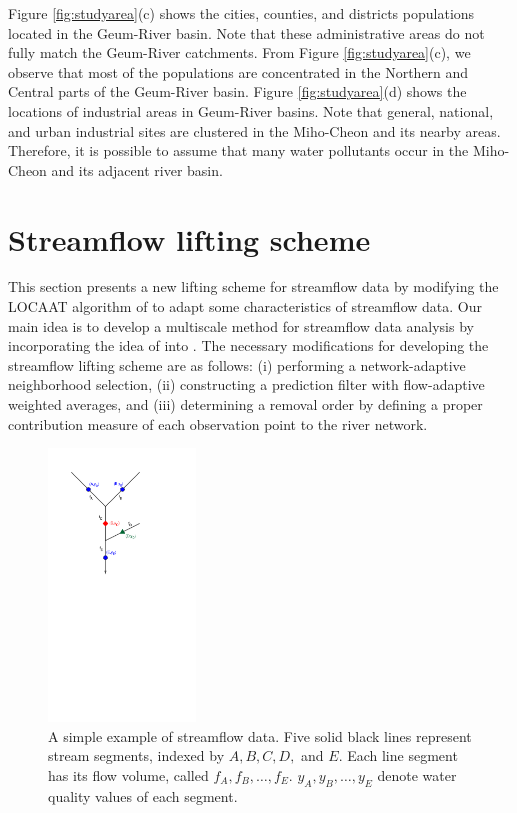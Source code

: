 \documentclass[11pt,titlepage]{article}
\begin{document}
Figure \ref{fig:studyarea}(c) shows the cities, counties, and districts populations located in the Geum-River basin. Note that these administrative areas do not fully match the Geum-River catchments. From Figure \ref{fig:studyarea}(c), we observe that most of the populations are concentrated in the Northern and Central parts of the Geum-River basin. Figure \ref{fig:studyarea}(d) shows the locations of industrial areas in Geum-River basins. Note that general, national, and urban industrial sites are clustered in the Miho-Cheon and its nearby areas. Therefore, it is possible to assume that many water pollutants occur in the Miho-Cheon and its adjacent river basin.


\section{Streamflow lifting scheme}\label{sec:streamflowliftingscheme}

This section presents a new lifting scheme for streamflow data by modifying the LOCAAT algorithm of  \citet{Jansen2009} to adapt some characteristics of streamflow data. Our main idea is to develop a multiscale method for streamflow data analysis by incorporating the idea of \cite{Nunes2006} into \cite{ODonnell2014}. The necessary modifications for developing the streamflow lifting scheme are as follows: (i) performing a network-adaptive neighborhood selection, (ii) constructing a prediction filter with flow-adaptive weighted averages, and (iii) determining a removal order by defining a proper contribution measure of each observation point to the river network.

\begin{figure}
	\centering\includegraphics[width=0.35\textwidth]{Stream_result/Node-flow-complexed2-3.pdf}
	\vspace{-0mm}
	\caption{A simple example of streamflow data. Five solid black lines represent stream segments, indexed by $A,B,C,D,$ and $E$. Each line segment has its flow volume, called $f_{A}, f_{B}, \ldots, f_E$. $y_{A}, y_{B}, \ldots , y_{E}$ denote water quality values of each segment.}
	\label{fig:nodedescription}
\end{figure}
\end{document}
